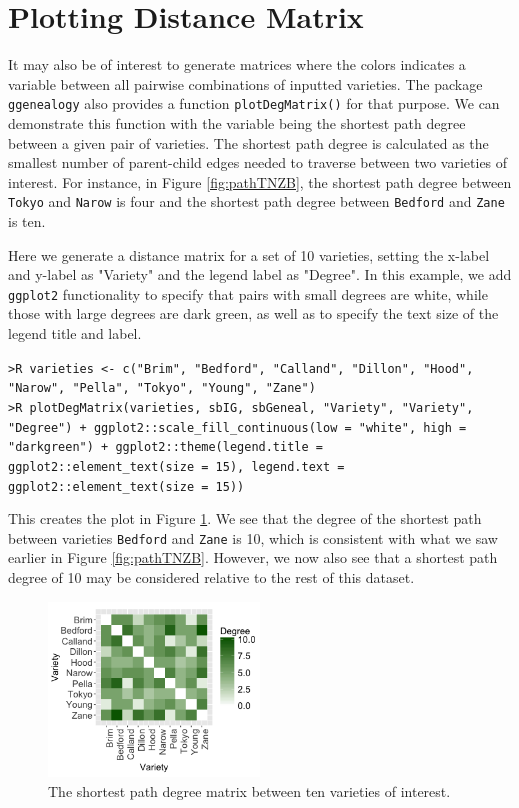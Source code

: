 \documentclass[11pt,a4paper,oldfontcommands,openany]{memoir}
\DeclareRobustCommand{\mybox}[2][gray!15]{%
\begin{tcolorbox}[   %
        breakable,
        left=0pt,
        right=0pt,
        top=0pt,
        bottom=0pt,
        colback=#1,
        colframe=#1,
        width=\dimexpr\textwidth\relax, 
        enlarge left by=0mm,
        boxsep=5pt,
        arc=0pt,outer arc=0pt,
        ]
        #2
\end{tcolorbox}
}
\numberwithin{equation}{section} %
\newcommand{\code}[1]{{\texttt{#1}}}
\newcommand{\pkg}[1]{{\texttt{#1}}}
\begin{document}
\section{Plotting Distance Matrix}

It may also be of interest to generate matrices where the colors indicates a variable between all pairwise combinations of inputted varieties. The package \pkg{ggenealogy} also provides a function \code{plotDegMatrix()} for that purpose. We can demonstrate this function with the variable being the shortest path degree between a given pair of varieties. The shortest path degree is calculated as the smallest number of parent-child edges needed to traverse between two varieties of interest. For instance, in Figure \ref{fig:pathTNZB}, the shortest path degree between \code{Tokyo} and \code{Narow} is four and the shortest path degree between \code{Bedford} and \code{Zane} is ten.

Here we generate a distance matrix for a set of 10 varieties, setting the x-label and y-label as "Variety" and the legend label as "Degree". In this example, we add \pkg{ggplot2} functionality to specify that pairs with small degrees are white, while those with large degrees are dark green, as well as to specify the text size of the legend title and label.

\mybox{
\texttt{>R varieties <- c("Brim", "Bedford", "Calland", "Dillon", "Hood", "Narow", "Pella", "Tokyo", "Young", "Zane")}\\
\texttt{>R plotDegMatrix(varieties, sbIG, sbGeneal, "Variety", "Variety", "Degree") + ggplot2::scale\_fill\_continuous(low = "white", high = "darkgreen") + ggplot2::theme(legend.title = ggplot2::element\_text(size = 15), legend.text = ggplot2::element\_text(size = 15))}
}

This creates the plot in Figure \ref{fig:degMatrix}. We see that the degree of the shortest path between varieties \code{Bedford} and \code{Zane} is 10, which is consistent with what we saw earlier in Figure \ref{fig:pathTNZB}. However, we now also see that a shortest path degree of 10 may be considered relative to the rest of this dataset.

\begin{figure}[h]
    \begin{framed}
    \centering
    \includegraphics[width=0.5\textwidth]{degMatrix}
    \end{framed}
    \caption{The shortest path degree matrix between ten varieties of interest.}
    \label{fig:degMatrix}
\end{figure}
\end{document}
